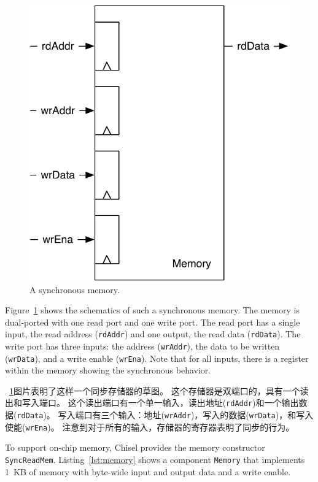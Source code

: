 \documentclass[%
    10pt,
    headinclude, footexclude,
    openright, %
    notitlepage,
    cleardoubleempty,
    headsepline,
    pointlessnumbers,
    bibtotoc, idxtotoc,
    ]{scrbook}
\newcommand{\code}[1]{{\small{\texttt{#1}}}}
\newcommand{\scale}{0.7}
\begin{document}
\begin{figure}
  \centering
  \includegraphics[scale=\scale]{figures/memory}
  \caption{A synchronous memory.}
  \label{fig:memory}
\end{figure}

Figure~\ref{fig:memory} shows the schematics of such a synchronous memory.
The memory is dual-ported with one read port and one write port.
The read port has a single input, the read address (\code{rdAddr}) and
one output, the read data (\code{rdData}).
The write port has three inputs: the address (\code{wrAddr}), the data
to be written (\code{wrData}), and a write enable (\code{wrEna}).
Note that for all inputs, there is a register within the memory showing the
synchronous behavior.

~\ref{fig:memory}图片表明了这样一个同步存储器的草图。
这个存储器是双端口的，具有一个读出和写入端口。
这个读出端口有一个单一输入，读出地址(\code{rdAddr})和一个输出数据(\code{rdData})。
写入端口有三个输入：地址(\code{wrAddr})，写入的数据(\code{wrData})，和写入使能(\code{wrEna})。
注意到对于所有的输入，存储器的寄存器表明了同步的行为。

To support on-chip memory, Chisel provides the memory constructor \code{SyncReadMem}.
Listing~\ref{lst:memory} shows a component \code{Memory} that implements
1~KB of memory with byte-wide input and output data and a write enable.
\end{document}
